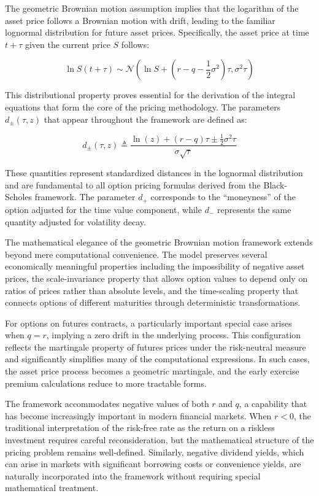\documentclass[
  american,
  11pt,
  11pt,
  letterpaper,
  onecolumn]{article}
\begin{document}
The geometric Brownian motion assumption implies that the logarithm of
the asset price follows a Brownian motion with drift, leading to the
familiar lognormal distribution for future asset prices. Specifically,
the asset price at time \(t+\tau\) given the current price \(S\)
follows:

\[\ln S(t+\tau) \sim \mathcal{N}\left(\ln S + (r-q-\frac{1}{2}\sigma^2)\tau, \sigma^2\tau\right)\]

This distributional property proves essential for the derivation of the
integral equations that form the core of the pricing methodology. The
parameters \(d_{\pm}(\tau, z)\) that appear throughout the framework are
defined as:

\[d_{\pm}(\tau, z) \triangleq \frac{\ln(z) + (r-q)\tau \pm \frac{1}{2}\sigma^2\tau}{\sigma\sqrt{\tau}}\]

These quantities represent standardized distances in the lognormal
distribution and are fundamental to all option pricing formulas derived
from the Black-Scholes framework. The parameter \(d_+\) corresponds to
the ``moneyness'' of the option adjusted for the time value component,
while \(d_-\) represents the same quantity adjusted for volatility
decay.

The mathematical elegance of the geometric Brownian motion framework
extends beyond mere computational convenience. The model preserves
several economically meaningful properties including the impossibility
of negative asset prices, the scale-invariance property that allows
option values to depend only on ratios of prices rather than absolute
levels, and the time-scaling property that connects options of different
maturities through deterministic transformations.

For options on futures contracts, a particularly important special case
arises when \(q = r\), implying a zero drift in the underlying process.
This configuration reflects the martingale property of futures prices
under the risk-neutral measure and significantly simplifies many of the
computational expressions. In such cases, the asset price process
becomes a geometric martingale, and the early exercise premium
calculations reduce to more tractable forms.

The framework accommodates negative values of both \(r\) and \(q\), a
capability that has become increasingly important in modern financial
markets. When \(r < 0\), the traditional interpretation of the risk-free
rate as the return on a riskless investment requires careful
reconsideration, but the mathematical structure of the pricing problem
remains well-defined. Similarly, negative dividend yields, which can
arise in markets with significant borrowing costs or convenience yields,
are naturally incorporated into the framework without requiring special
mathematical treatment.
\end{document}
